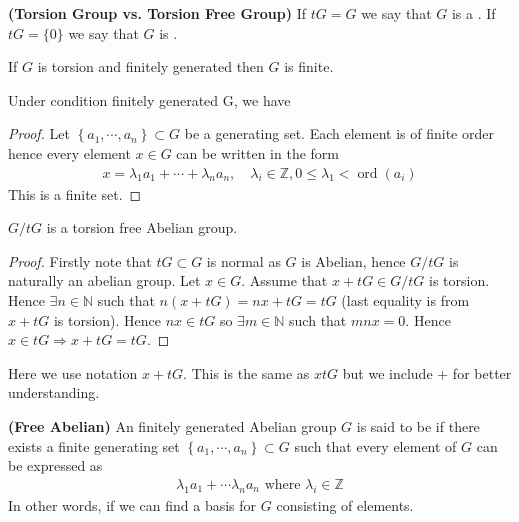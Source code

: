 \documentclass{article}
\newcommand{\bfs}[1]{\textbf{({#1}) }}
\begin{document}
\begin{defa}{\bfs{Torsion Group vs. Torsion Free Group}}
 If $tG=G$ we say that $G$ is a . If $tG=\{0\}$ we say that $G$ is .
\end{defa}
\begin{lema}
 If $G$ is torsion and finitely generated then $G$ is finite.
\end{lema} 
\begin{rema} Under condition finitely generated G, we have 

\centerline{}
\end{rema}
\begin{proof}
Let $\left\{a_{1}, \cdots, a_{n}\right\} \subset G$ be a generating set. Each element is of finite order hence every element $x \in G$ can be written in the form
\begin{align*}
x=\lambda_{1} a_{1}+\cdots+\lambda_{n} a_{n}, \quad \lambda_{i} \in \mathbb{Z}, 0 \leq \lambda_{1}<\operatorname{ord}\left(a_{i}\right)
\end{align*}
This is a finite set.
\end{proof} 
\begin{lema}
 $G/tG$ is a torsion free Abelian group.
\end{lema} 
\begin{proof}
Firstly note that $t G \subset G$ is normal as $G$ is Abelian, hence $G / t G$ is naturally an abelian group. Let $x \in G$. Assume that $x+t G \in G / t G$ is torsion. Hence $\exists n \in \mathbb{N}$ such that $n(x+t G)=n x+t G=t G$ (last equality is from $x+t G$ is torsion). Hence $n x \in t G$ so $\exists m \in \mathbb{N}$ such that $m n x=0$. Hence $x \in t G \Rightarrow x+tG=t G$.
\end{proof} 
\begin{rema}
Here we use notation  $x+t G$. This is the same as $xtG$ but we include $+$ for better understanding.
\end{rema}
\begin{defa}{\bfs{Free Abelian}}
 An finitely generated Abelian group $G$ is said to be  if there exists a finite generating set $\left\{a_{1}, \cdots, a_{n}\right\} \subset G$ such that every element of $G$ can be  expressed as
\begin{align*}
\lambda_{1} a_{1}+\cdots \lambda_{n} a_{n} \text { where } \lambda_{i} \in \mathbb{Z}
\end{align*}
In other words, if we can find a basis for $G$ consisting of  elements.
\end{defa} 
\end{document}
